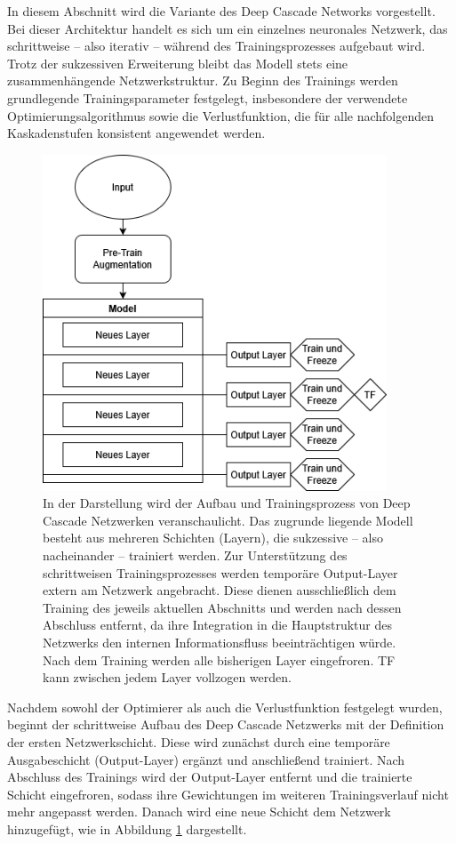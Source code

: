 In diesem Abschnitt wird die Variante des Deep Cascade Networks vorgestellt. Bei dieser Architektur handelt es sich um ein einzelnes neuronales 
Netzwerk, das schrittweise – also iterativ – während des Trainingsprozesses aufgebaut wird. Trotz der sukzessiven Erweiterung bleibt das Modell 
stets eine zusammenhängende Netzwerkstruktur. Zu Beginn des Trainings werden grundlegende Trainingsparameter festgelegt, insbesondere der 
verwendete Optimierungsalgorithmus sowie die Verlustfunktion, die für alle nachfolgenden Kaskadenstufen konsistent 
angewendet werden.

\begin{figure}[htpb]
    \centering
    \includegraphics[height=10cm]{../../Graphiken/deepcascade_2.png}
    \caption{\label{fig:deepcascade}
    \small{In der Darstellung wird der Aufbau und Trainingsprozess von Deep Cascade Netzwerken veranschaulicht. Das zugrunde liegende Modell 
    besteht aus mehreren Schichten (Layern), die sukzessive – also nacheinander – trainiert werden. Zur Unterstützung des schrittweisen 
    Trainingsprozesses werden temporäre Output-Layer extern am Netzwerk angebracht. Diese dienen ausschließlich dem Training 
    des jeweils aktuellen Abschnitts und werden nach dessen Abschluss entfernt, da ihre Integration in die Hauptstruktur des Netzwerks den 
    internen Informationsfluss beeinträchtigen würde. Nach dem Training werden alle bisherigen Layer eingefroren. TF kann zwischen jedem Layer 
    vollzogen werden.}}
\end{figure}

Nachdem sowohl der Optimierer als auch die Verlustfunktion festgelegt wurden, beginnt der schrittweise Aufbau des Deep Cascade Netzwerks mit der 
Definition der ersten Netzwerkschicht. Diese wird zunächst durch eine temporäre Ausgabeschicht (Output-Layer) ergänzt und anschließend trainiert. 
Nach Abschluss des Trainings wird der Output-Layer entfernt und die trainierte Schicht eingefroren, sodass ihre Gewichtungen im weiteren 
Trainingsverlauf nicht mehr angepasst werden. Danach wird eine neue Schicht dem Netzwerk hinzugefügt, wie in Abbildung 
\ref{fig:deepcascade} dargestellt.

